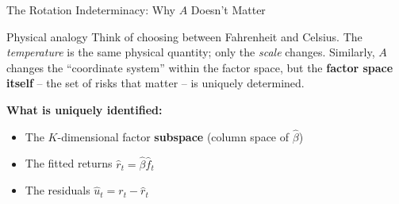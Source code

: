 \documentclass[aspectratio=169]{beamer}
\begin{document}
\begin{frame}{The Rotation Indeterminacy: Why $A$ Doesn't Matter}

\begin{exampleblock}{Physical analogy}
Think of choosing between Fahrenheit and Celsius. The \textit{temperature} is the same physical quantity; only the \textit{scale} changes. Similarly, $A$ changes the ``coordinate system'' within the factor space, but the \textbf{factor space itself} -- the set of risks that matter -- is uniquely determined.
\end{exampleblock}

\vspace{0.3em}

\textbf{What is uniquely identified:}
\begin{itemize}
    \item The $K$-dimensional factor \textbf{subspace} (column space of $\hat{\beta}$)
    \item The fitted returns $\hat{r}_t = \hat{\beta}\hat{f}_t$
    \item The residuals $\hat{u}_t = r_t - \hat{r}_t$
\end{itemize}

\end{frame}
%
%
\end{document}
